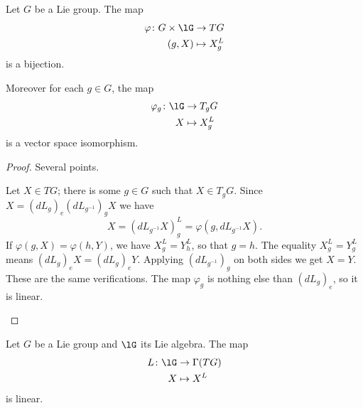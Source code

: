 \begin{proposition}
	Let \( G\) be a Lie group. The map
	\begin{equation}
		\begin{aligned}
			\varphi\colon G\times \lG & \to TG        \\
			(g,X)                     & \mapsto X^L_g
		\end{aligned}
	\end{equation}
	is a bijection.

	Moreover for each \( g\in G\), the map
	\begin{equation}
		\begin{aligned}
			\varphi_g\colon \lG & \to T_gG      \\
			X                   & \mapsto X^L_g
		\end{aligned}
	\end{equation}
	is a vector space isomorphism.
\end{proposition}

\begin{proof}
	Several points.
	\begin{subproof}
		Let \( X\in TG\); there is some \( g\in G\) such that \( X\in T_gG\). Since \( X=(dL_g)_e(dL_{g^{-1}})_gX\) we have
		\begin{equation}
			X=(dL_{g^{-1}}X)^L_g=\varphi(g,dL_{g^{-1}}X).
		\end{equation}
		If \( \varphi(g,X)=\varphi(h,Y)\), we have \( X_g^L=Y^L_h\), so that \( g=h\). The equality  \( X_g^L=Y_g^L\) means \( (dL_g)_eX=(dL_g)_eY\). Applying \( (dL_{g^{-1}})_g\) on both sides we get \( X=Y\).
		These are the same verifications.
		The map \( \varphi_g\) is nothing else than \( (dL_g)_e\), so it is linear.
	\end{subproof}
\end{proof}


\begin{proposition}      \label{PROPooWWXKooWEBpMf}
	Let \( G\) be a Lie group and \( \lG\) its Lie algebra. The map
	\begin{equation}
		\begin{aligned}
			L\colon \lG & \to \Gamma(TG) \\
			X           & \mapsto X^L
		\end{aligned}
	\end{equation}
	is linear.
\end{proposition}

